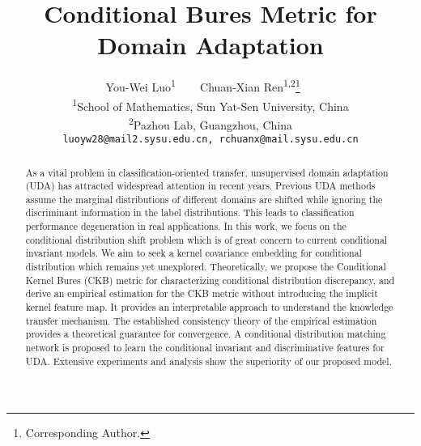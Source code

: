 \documentclass[final]{cvpr}
\begin{document}
\title{Conditional Bures Metric for Domain Adaptation}

\author{You-Wei Luo\textsuperscript{1} ~~~ Chuan-Xian Ren\textsuperscript{1,2}\thanks{Corresponding Author.} ~~\\
\textsuperscript{1}School of Mathematics, Sun Yat-Sen University, China\\
\textsuperscript{2}Pazhou Lab, Guangzhou, China\\
{\tt\small luoyw28@mail2.sysu.edu.cn,  rchuanx@mail.sysu.edu.cn}
}
\maketitle


\begin{abstract}
   As a vital problem in classification-oriented transfer, unsupervised domain adaptation (UDA) has attracted widespread attention in recent years. Previous UDA methods assume the marginal distributions of different domains are shifted while ignoring the discriminant information in the label distributions. This leads to classification performance degeneration in real applications. In this work, we focus on the conditional distribution shift problem which is of great concern to current conditional invariant models. We aim to seek a kernel covariance embedding for conditional distribution which remains yet unexplored. Theoretically, we propose the Conditional Kernel Bures (CKB) metric for characterizing conditional distribution discrepancy, and derive an empirical estimation for the CKB metric without introducing the implicit kernel feature map. It provides an interpretable approach to understand the knowledge transfer mechanism. The established consistency theory of the empirical estimation provides a theoretical guarantee for convergence. A conditional distribution matching network is proposed to learn the conditional invariant and discriminative features for UDA. Extensive experiments and analysis show the superiority of our proposed model.
\end{abstract}
\end{document}
